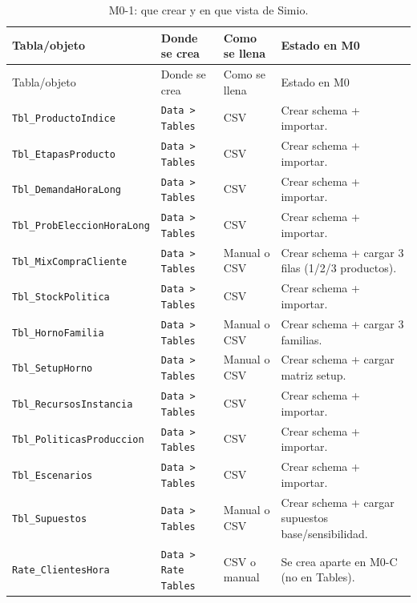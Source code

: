 \documentclass[11pt]{article}
\newcommand{\simio}[1]{\texttt{#1}}
\newcommand{\tabla}[1]{\texttt{#1}}
\begin{document}
{\scriptsize
\begin{longtable}{L{3.8cm}L{2.7cm}L{3.3cm}L{4.0cm}}
\caption{M0-1: que crear y en que vista de Simio.}\\
\toprule
{}
\color{white}Tabla/objeto & \color{white}Donde se crea & \color{white}Como se llena & \color{white}Estado en M0 \\
\midrule
\endfirsthead
\toprule
{}
\color{white}Tabla/objeto & \color{white}Donde se crea & \color{white}Como se llena & \color{white}Estado en M0 \\
\midrule
\endhead
\tabla{Tbl\_ProductoIndice} & \simio{Data > Tables} & CSV & Crear schema + importar. \\
\tabla{Tbl\_EtapasProducto} & \simio{Data > Tables} & CSV & Crear schema + importar. \\
\tabla{Tbl\_DemandaHoraLong} & \simio{Data > Tables} & CSV & Crear schema + importar. \\
\tabla{Tbl\_ProbEleccionHoraLong} & \simio{Data > Tables} & CSV & Crear schema + importar. \\
\tabla{Tbl\_MixCompraCliente} & \simio{Data > Tables} & Manual o CSV & Crear schema + cargar 3 filas (1/2/3 productos). \\
\tabla{Tbl\_StockPolitica} & \simio{Data > Tables} & CSV & Crear schema + importar. \\
\tabla{Tbl\_HornoFamilia} & \simio{Data > Tables} & Manual o CSV & Crear schema + cargar 3 familias. \\
\tabla{Tbl\_SetupHorno} & \simio{Data > Tables} & Manual o CSV & Crear schema + cargar matriz setup. \\
\tabla{Tbl\_RecursosInstancia} & \simio{Data > Tables} & CSV & Crear schema + importar. \\
\tabla{Tbl\_PoliticasProduccion} & \simio{Data > Tables} & CSV & Crear schema + importar. \\
\tabla{Tbl\_Escenarios} & \simio{Data > Tables} & CSV & Crear schema + importar. \\
\tabla{Tbl\_Supuestos} & \simio{Data > Tables} & Manual o CSV & Crear schema + cargar supuestos base/sensibilidad. \\
\tabla{Rate\_ClientesHora} & \simio{Data > Rate Tables} & CSV o manual & Se crea aparte en M0-C (no en Tables). \\
\bottomrule
\end{longtable}
}
\end{document}
